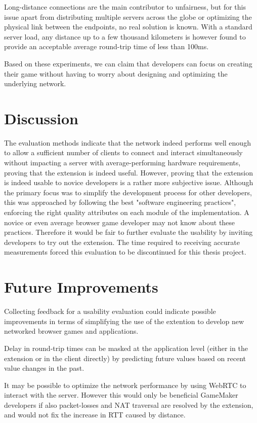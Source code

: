 \documentclass[bsc, 12pt, twoside, singlespacing, parskip, abbrevs, notimes, normalheadings, logo]{styles/infthesis}
\begin{document}
Long-distance connections are the main contributor to unfairness, but for this issue apart from distributing multiple servers across the globe or optimizing the physical link between the endpoints, no real solution is known. With a standard server load, any distance up to a few thousand kilometers is however found to provide an acceptable average round-trip time of less than 100ms.

Based on these experiments, we can claim that developers can focus on creating their game without having to worry about designing and optimizing the underlying network.

\section{Discussion}
The evaluation methods indicate that the network indeed performs well enough to allow a sufficient number of clients to connect and interact simultaneously without impacting a server with average-performing hardware requirements, proving that the extension is indeed useful.
However, proving that the extension is indeed usable to novice developers is a rather more subjective issue. Although the primary focus was to simplify the development process for other developers, this was approached by following the best "software engineering practices", enforcing the right quality attributes on each module of the implementation. A novice or even average browser game developer may not know about these practices. Therefore it would be fair to further evaluate the usability by inviting developers to try out the extension.
The time required to receiving accurate measurements forced this evaluation to be discontinued for this thesis project.

\section{Future Improvements}
Collecting feedback for a usability evaluation could indicate possible improvements in terms of simplifying the use of the extention to develop new networked browser games and applications.

Delay in round-trip times can be masked at the application level (either in the extension or in the client directly) by predicting future values based on recent value changes in the past.

It may be possible to optimize the network performance by using WebRTC to interact with the server. However this would only be beneficial GameMaker developers if also packet-losses and NAT traversal are resolved by the extension, and would not fix the increase in RTT caused by distance.
\end{document}
